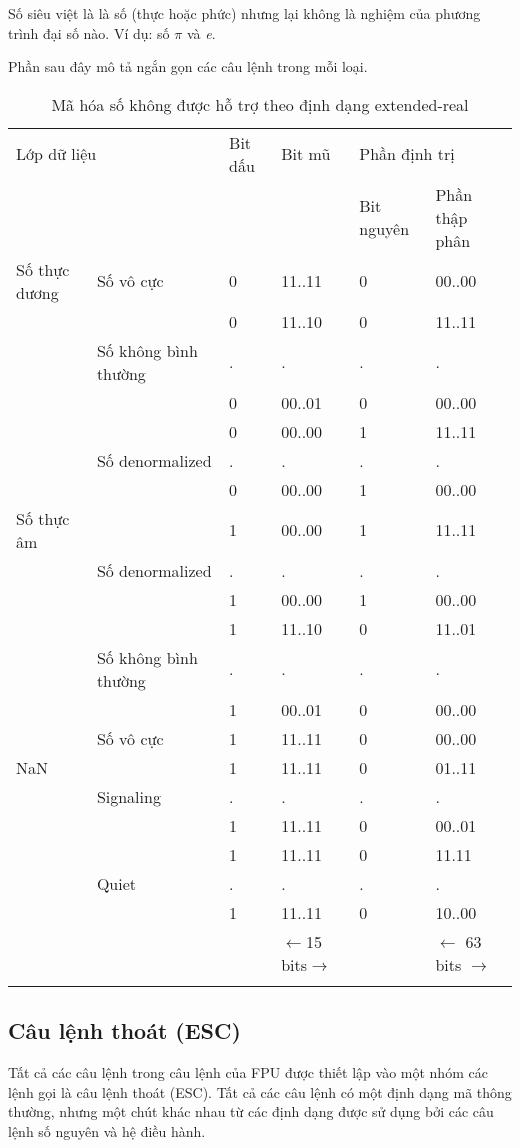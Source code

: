 	Số siêu việt là là số (thực hoặc phức) nhưng lại không là nghiệm của phương trình đại số nào. Ví dụ: số $\pi $ và \textit{e}. 
	
		
	Phần sau đây mô tả ngắn gọn các câu lệnh trong mỗi loại. 
	\begin{longtable}{|m{2cm}|l|l|l|l|l|}
	\hline
		\multicolumn{2}{|l|}{Lớp dữ liệu} & Bit dấu & Bit mũ & \multicolumn{2}{l|}{Phần định trị}\\
		\cline{5-6}
		 \multicolumn{2}{|l|}{} & & & Bit nguyên & Phần thập phân \\
	\hline
	\hline
		Số thực dương & Số vô cực &0 &  11..11 & 0 & 00..00 \\
		\cline{2-6}
		 &  & 0 &11..10 & 0 & 11..11 \\		
		  &Số không bình thường & . & . & . & . \\
		  &	&0 &00..01& 0&  00..00 \\		 
		 \cline{2-6}
		 & & 0 & 00..00 & 1 & 11..11\\			
		 & Số denormalized  & . & . & . & . \\
		 &	&0 &00..00& 1 &  00..00 \\		
	\hline
		Số thực âm &   & 1 &00..00 & 1 & 11..11 \\		
		 & Số denormalized  & . & . & . & . \\
		 &	& 1  &00..00& 1 &  00..00 \\		
		\cline{2-6}
		 &  &  1 &11..10 & 0 &11..01\\
		  & Số không bình thường  & . & . & . & . \\
		 &	& 1  &00..01 & 0 &  00..00 \\		
		 \cline{2-6}
		 & Số vô cực  & 1 & 11..11 & 0 & 00..00\\
	\hline
		NaN&  & 1  &11..11 & 0 & 01..11 \\
		& Signaling  & . & . & . & . \\
		 &	& 1  &11..11& 0 &  00..01 \\		
	\hline		
		 & & 1 & 11..11 & 0 & 11.11\\
		 &  Quiet  & . & . & . & . \\
		 &	& 1  &11..11& 0 &  10..00 \\		
	\hline
		 \multicolumn{3}{l|}{} & $\leftarrow$15 bits$\to$ & & $\leftarrow$ 63 bits $\to$ \\
		\caption{Mã hóa số không được hỗ trợ  theo định dạng extended-real}
		\label{tb:MaHoaExtended}
	\end{longtable}
	
		\subsection*{ Câu lệnh thoát (ESC)}
	Tất cả các câu lệnh trong câu lệnh của FPU được thiết lập vào một nhóm các lệnh gọi là câu lệnh thoát (ESC). Tất cả các câu lệnh có một định dạng mã thông thường, nhưng một chút khác nhau từ các định dạng được sử dụng bởi các câu lệnh số nguyên và hệ điều hành.
	
